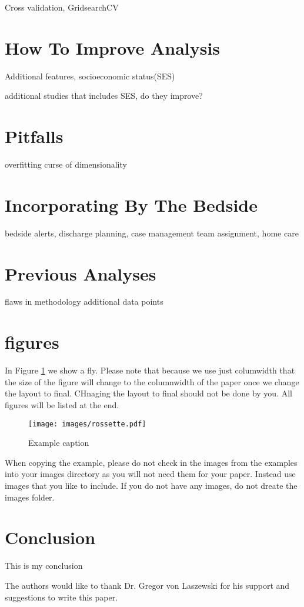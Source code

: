 \documentclass[sigconf]{acmart}
\begin{document}
Cross validation, GridsearchCV

\section{How To Improve Analysis}

Additional features, socioeconomic status(SES)

additional studies that includes SES, do they improve?

\section{Pitfalls}

overfitting
curse of dimensionality

\section{Incorporating By The Bedside}
bedside alerts, discharge planning, case management team assignment, home care

\section{Previous Analyses}

flaws in methodology
additional data points

\section{figures}

In Figure \ref{f:fly} we show a fly. Please note that because we use
just columwidth that the size of the figure will change to the
columnwidth of the paper once we change the layout to final. CHnaging
the layout to final should not be done by you. All figures will be
listed at the end.

\begin{figure}[!ht]
  \centering\texttt{[image: images/rossette.pdf]}
  \caption{Example caption}\label{f:fly}
\end{figure}

When copying the example, please do not check in the images from the
examples into your images directory as you will not need them for your
paper. Instead use images that you like to include. If you do not have
any images, do not dreate the images folder.

\section{Conclusion}

This is my conclusion

\begin{acks}

  The authors would like to thank Dr. Gregor von Laszewski for his
  support and suggestions to write this paper.

\end{acks}


 

\appendix


\end{document}
